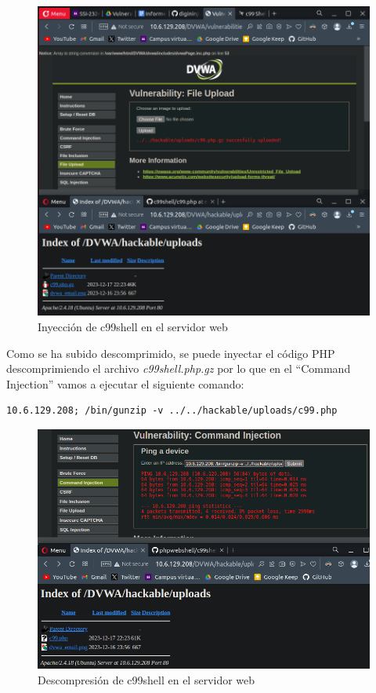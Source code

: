 \documentclass[11pt]{report}
\begin{document}
\begin{itemize}
\begin{figure}[H]
          \includegraphics[scale=0.28]{img/UbuntuServer/UbuntuServer_Base_7_c99shell.png}
          \caption{Inyección de c99shell en el servidor web}
        \end{figure}

        Como se ha subido descomprimido, se puede inyectar el código PHP descomprimiendo el archivo \emph{c99shell.php.gz} por lo que
        en el “Command Injection” vamos a ejecutar el siguiente comando:
        \begin{verbatim}
10.6.129.208; /bin/gunzip -v ../../hackable/uploads/c99.php
        \end{verbatim}
        \begin{figure}[H]
          \centering
          \includegraphics[scale=0.36]{img/UbuntuServer/UbuntuServer_Base_7_c99shell_2.png}
          \caption{Descompresión de c99shell en el servidor web}
        \end{figure}


\end{itemize}
\end{document}
